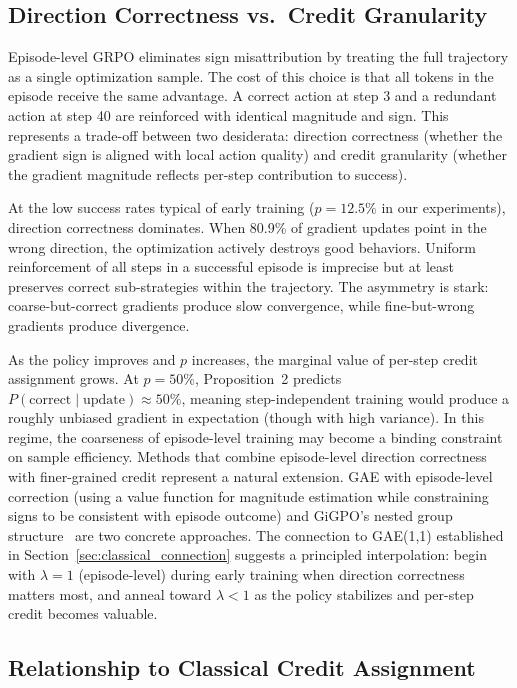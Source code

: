 \subsection{Direction Correctness vs.\ Credit Granularity}
\label{sec:discussion_tradeoff}

Episode-level GRPO eliminates sign misattribution by treating the full trajectory as a single optimization sample. The cost of this choice is that all tokens in the episode receive the same advantage. A correct action at step 3 and a redundant action at step 40 are reinforced with identical magnitude and sign. This represents a trade-off between two desiderata: direction correctness (whether the gradient sign is aligned with local action quality) and credit granularity (whether the gradient magnitude reflects per-step contribution to success).

At the low success rates typical of early training ($p = 12.5\%$ in our experiments), direction correctness dominates. When 80.9\% of gradient updates point in the wrong direction, the optimization actively destroys good behaviors. Uniform reinforcement of all steps in a successful episode is imprecise but at least preserves correct sub-strategies within the trajectory. The asymmetry is stark: coarse-but-correct gradients produce slow convergence, while fine-but-wrong gradients produce divergence.

As the policy improves and $p$ increases, the marginal value of per-step credit assignment grows. At $p = 50\%$, Proposition~2 predicts $P(\text{correct} \mid \text{update}) \approx 50\%$, meaning step-independent training would produce a roughly unbiased gradient in expectation (though with high variance). In this regime, the coarseness of episode-level training may become a binding constraint on sample efficiency. Methods that combine episode-level direction correctness with finer-grained credit represent a natural extension. GAE with episode-level correction (using a value function for magnitude estimation while constraining signs to be consistent with episode outcome) and GiGPO's nested group structure~\cite{feng2025gigpo} are two concrete approaches. The connection to GAE(1,1) established in Section~\ref{sec:classical_connection} suggests a principled interpolation: begin with $\lambda = 1$ (episode-level) during early training when direction correctness matters most, and anneal toward $\lambda < 1$ as the policy stabilizes and per-step credit becomes valuable.

\subsection{Relationship to Classical Credit Assignment}
\label{sec:discussion_classical}

